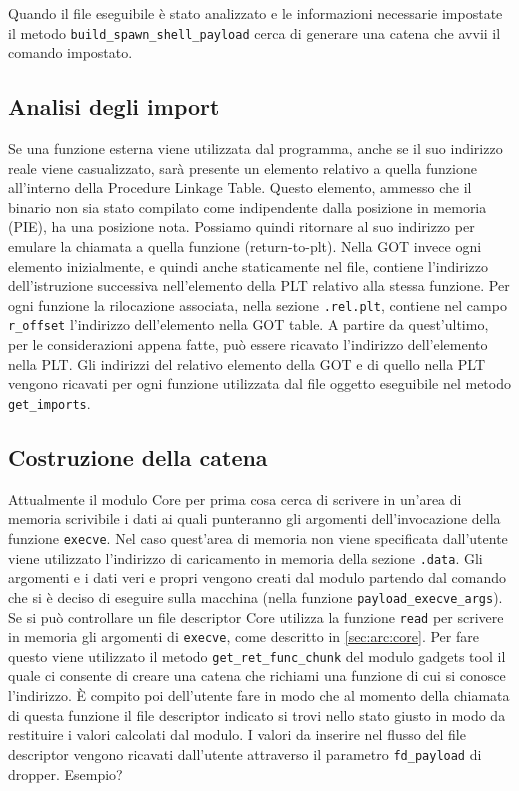 Quando il file eseguibile è stato analizzato e le informazioni
necessarie impostate il metodo \lstinline{build_spawn_shell_payload}
cerca di generare una catena che avvii il comando impostato.

\subsection{Analisi degli import}

Se una funzione esterna viene utilizzata dal programma, anche se il
suo indirizzo reale viene casualizzato, sarà presente un elemento
relativo a quella funzione all'interno della Procedure Linkage
Table. Questo elemento, ammesso che il binario non sia stato compilato
come indipendente dalla posizione in memoria (PIE), ha una posizione
nota. Possiamo quindi ritornare al suo indirizzo per emulare la
chiamata a quella funzione (return-to-plt). Nella GOT invece ogni
elemento inizialmente, e quindi anche staticamente nel file, contiene
l'indirizzo dell'istruzione successiva nell'elemento della PLT
relativo alla stessa funzione. Per ogni funzione la rilocazione
associata, nella sezione \lstinline{.rel.plt}, contiene nel campo
\lstinline{r_offset} l'indirizzo dell'elemento nella GOT table. A
partire da quest'ultimo, per le considerazioni appena fatte, può
essere ricavato l'indirizzo dell'elemento nella PLT. Gli indirizzi del
relativo elemento della GOT e di quello nella PLT vengono ricavati per
ogni funzione utilizzata dal file oggetto eseguibile nel metodo
\lstinline{get_imports}.

\subsection{Costruzione della catena}

Attualmente il modulo Core per prima cosa cerca di scrivere in un'area
di memoria scrivibile i dati ai quali punteranno gli argomenti
dell'invocazione della funzione \lstinline{execve}. Nel caso
quest'area di memoria non viene specificata dall'utente viene
utilizzato l'indirizzo di caricamento in memoria della sezione
\lstinline{.data}. Gli argomenti e i dati veri e propri vengono creati
dal modulo partendo dal comando che si è deciso di eseguire sulla
macchina (nella funzione \lstinline{payload_execve_args}). Se si può
controllare un file descriptor Core utilizza la funzione
\lstinline{read} per scrivere in memoria gli argomenti di
\lstinline{execve}, come descritto in \ref{sec:arc:core}. Per fare
questo viene utilizzato il metodo \lstinline{get_ret_func_chunk} del
modulo gadgets tool il quale ci consente di creare una catena che
richiami una funzione di cui si conosce l'indirizzo. È compito poi
dell'utente fare in modo che al momento della chiamata di questa
funzione il file descriptor indicato si trovi nello stato giusto in
modo da restituire i valori calcolati dal modulo. I valori da inserire
nel flusso del file descriptor vengono ricavati dall'utente attraverso
il parametro \lstinline{fd_payload} di dropper.
Esempio?

